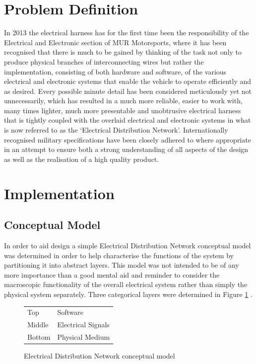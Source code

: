 \section{Problem Definition}

In 2013 the electrical harness has for the first time been the responsibility of the Electrical and Electronic section of MUR Motorsports, where it has been recognised that there is much to be gained by thinking of the task not only to produce physical branches of interconnecting wires but rather the implementation, consisting of both hardware and software, of the various electrical and electronic systems that enable the vehicle to operate efficiently and as desired.  Every possible minute detail has been considered meticulously yet not unnecessarily, which has resulted in a much more reliable, easier to work with, many times lighter, much more presentable and unobtrusive electrical harness that is tightly coupled with the overlaid electrical and electronic systems in what is now referred to as the ‘Electrical Distribution Network’.  Internationally recognised military specifications have been closely adhered to where appropriate in an attempt to ensure both a strong understanding of all aspects of the design as well as the realisation of a high quality product.

\section{Implementation}

\subsection{Conceptual Model}

In order to aid design a simple Electrical Distribution Network conceptual model was determined in order to help characterise the functions of the system by partitioning it into abstract layers.  This model was not intended to be of any more importance than a good mental aid and reminder to consider the macroscopic functionality of the overall electrical system rather than simply the physical system separately.  Three categorical layers were determined in Figure \ref{fig:EDN_model} .

\begin{figure}[h!]
	\centering
	\begin{tabular}{ l l }
	  Top	&	Software \\
	  Middle	&	Electrical Signals \\
	  Bottom	&	Physical Medium \\
	\end{tabular}
	\caption{Electrical Distribution Network conceptual model}
	\label{fig:EDN_model}
\end{figure}

